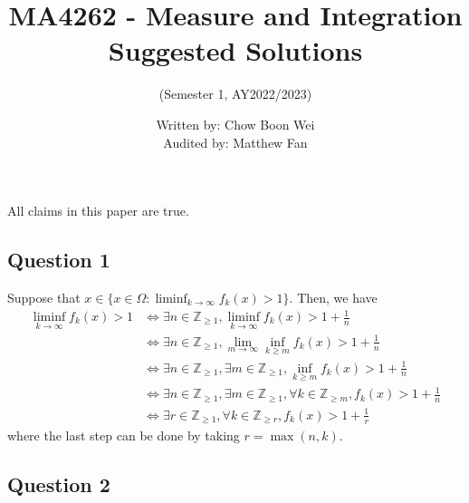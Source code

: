 \documentclass{article}
\title{MA4262 - Measure and Integration Suggested Solutions}
\author{(Semester 1, AY2022/2023)}
\date{Written by: Chow Boon Wei\\Audited by: Matthew Fan}
\newcommand{\Z}{\mathbb{Z}}
\begin{document}
\maketitle
All claims in this paper are true. 

\subsection*{Question 1}

Suppose that $x\in \{ x \in \Omega: \liminf_{k\to\infty} f_k (x) > 1 \}$. Then, we have 
\begin{align*}
    \liminf_{k\to\infty} f_k (x) > 1
    &\iff \exists n\in\Z_{\geq 1}, \liminf_{k\to\infty} f_k(x) > 1 + \frac{1}{n} \\
    &\iff \exists n\in\Z_{\geq 1}, \lim_{m\to\infty}\inf_{k\geq m} f_k(x) > 1 + \frac{1}{n} \\
    &\iff \exists n\in\Z_{\geq 1}, \exists m\in\Z_{\geq 1}, \inf_{k\geq m} f_k(x) > 1 + \frac{1}{n} \\
    &\iff \exists n\in\Z_{\geq 1}, \exists m\in\Z_{\geq 1}, \forall k\in \Z_{\geq m}, f_k(x) > 1 + \frac{1}{n} \\
    &\iff \exists r\in\Z_{\geq 1}, \forall k\in \Z_{\geq r}, f_k(x) > 1 + \frac{1}{r} 
\end{align*}
where the last step can be done by taking $r=\max(n,k)$. 
\subsection*{Question 2}
\end{document}
